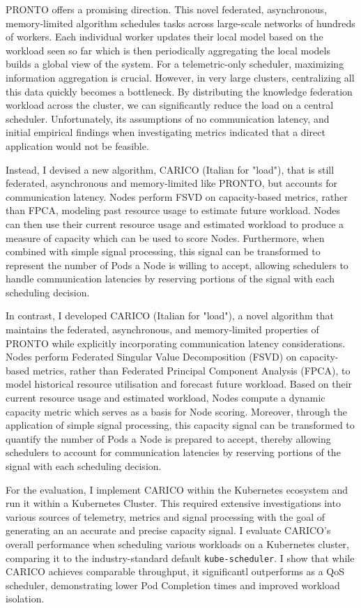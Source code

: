 PRONTO \cite{} offers a promising direction. This novel federated, asynchronous,
memory-limited algorithm schedules tasks across large-scale networks of hundreds
of workers. Each individual worker updates their local model based on the
workload seen so far which is then periodically aggregating the local models
builds a global view of the system. For a telemetric-only scheduler, maximizing
information aggregation is crucial. However, in very large clusters,
centralizing all this data quickly becomes a bottleneck. By distributing the
knowledge federation workload across the cluster, we can significantly reduce
the load on a central scheduler. Unfortunately, its assumptions of no
communication latency, and initial empirical findings when investigating
metrics indicated that a direct application would not be feasible.

Instead, I devised a new algorithm, CARICO (Italian for "load"), that is still
federated, asynchronous and memory-limited like PRONTO, but accounts for
communication latency. Nodes perform FSVD on capacity-based metrics, rather than
FPCA, modeling past resource usage to estimate future workload. Nodes can then
use their current resource usage and estimated workload to produce a measure of
capacity which can be used to score Nodes. Furthermore, when combined with
simple signal processing, this signal can be transformed to represent the number
of Pods a Node is willing to accept, allowing schedulers to handle communication
latencies by reserving portions of the signal with each scheduling decision.

In contrast, I developed CARICO (Italian for "load"), a novel algorithm that
maintains the federated, asynchronous, and memory-limited properties of PRONTO
while explicitly incorporating communication latency considerations. Nodes
perform Federated Singular Value Decomposition (FSVD)
on capacity-based metrics, rather than Federated Principal Component Analysis
(FPCA), to model historical resource utilisation and forecast future workload.
Based on their current resource usage and estimated workload, Nodes
compute a dynamic capacity metric which serves as a basis for Node scoring.
Moreover, through the application of simple signal processing, this capacity
signal can be transformed to quantify the number of Pods a Node is prepared to
accept, thereby allowing schedulers to account for communication latencies by
reserving portions of the signal with each scheduling decision.

For the evaluation, I implement CARICO within the Kubernetes ecosystem and run
it within a Kubernetes Cluster. This required extensive investigations into
various sources of telemetry, metrics and signal processing with the goal of
generating an an accurate and precise capacity signal. I evaluate CARICO's
overall performance when scheduling various workloads on a Kubernetes cluster,
comparing it to the industry-standard default \texttt{kube-scheduler}. I show
that while CARICO achieves comparable throughput, it significantl outperforms as
a QoS scheduler, demonstrating lower Pod Completion times and improved workload
isolation.

